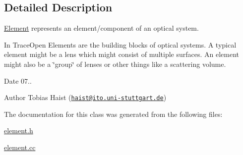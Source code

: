 \subsection{Detailed Description}
\hyperlink{classElement}{Element} represents an element/component of an optical system. 

In Trace\+Open Elements are the building blocks of optical systems. A typical element might be a lens which might consist of multiple surfaces. An element might also be a \char`\"{}group\char`\"{} of lenses or other things like a scattering volume.

\begin{DoxyDate}{Date}
07.. 
\end{DoxyDate}
\begin{DoxyAuthor}{Author}
Tobias Haist (\href{mailto:haist@ito.uni-stuttgart.de}{\tt haist@ito.\+uni-\/stuttgart.\+de}) 
\end{DoxyAuthor}


The documentation for this class was generated from the following files\+:\begin{DoxyCompactItemize}
\item 
\hyperlink{element_8h}{element.\+h}\item 
\hyperlink{element_8cc}{element.\+cc}\end{DoxyCompactItemize}
